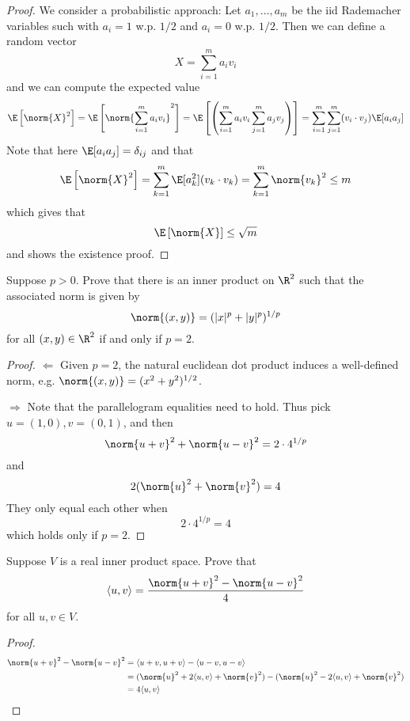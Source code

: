 \documentclass{extarticle}
\begin{document}
\begin{proof}
We consider a probabilistic approach: Let \(a_1, \ldots, a_m\) be the iid Rademacher variables
such with \(a_i = 1\) w.p. \(1/2\) and \(a_i = 0\) w.p. \(1/2\). Then we can define a random
vector
\[X = \sum_{i=1}^{m}a_i v_i\]
and we can compute the expected value
\[\E \left[\norm{X}^2 \right]
= \E \left[ \norm{\sum_{i=1}^{m} a_i v_i} ^2 \right]
= \E \left[ \left(\sum_{i=1}^{m} a_i v_i \sum_{j=1}^{m}a_j v_j \right) \right]
=  \sum_{i=1}^{m} \sum_{j=1}^{m} (v_i \cdot v_j) \E [a_i a_j]\]
Note that here \(\E[a_i a_j] = \delta_{ij}\) and that
\[\E \left[\norm{X}^2 \right]  = \sum_{k=1}^{m} \E[a_k^2](v_k \cdot v_k) = \sum_{k=1}^{m} \norm{v_k}^2 \leq m\]
which gives that
\[\E \left[\norm{X} \right]  \leq \sqrt{m}\]
and shows the existence proof.
\end{proof}

\begin{problem}{25}
    Suppose \(p > 0\). Prove that there is an inner product on \(\R^2\) such that the associated norm
    is given by
    \[\norm{(x, y)} = (|x|^p + |y|^{p})^{1/p}\]
    for all \((x,y) \in \R^2\) if and only if \(p = 2\).
\end{problem}

\begin{proof}
\(\Leftarrow\) Given \(p = 2\), the natural euclidean dot product induces a well-defined norm, e.g.
\(\norm{(x,y)} = (x^2 + y^2)^{1/2}\).

\(\Rightarrow\) Note that the parallelogram equalities need to hold. Thus pick \(u = (1,0), v = (0, 1)\),
and then
\[\norm{u + v}^2 + \norm{u - v}^2 = 2\cdot4^{1/p} \]
and
\[2(\norm{u}^2 + \norm{v}^2) = 4\]
They only equal each other when
\[2 \cdot 4^{1/p} = 4\]
which holds only if \(p = 2\).
\end{proof}

\begin{problem}{26}
    Suppose \(V\) is a real inner product space. Prove that
    \[\langle u,v \rangle = \frac{\norm{u + v}^2 - \norm{u - v}^2}{4}\]
    for all \(u, v \in V\).
\end{problem}

\begin{proof}
\begin{align*}
    \norm{u + v}^2 - \norm{u - v}^2
    &= \langle u+v,u+v \rangle - \langle u-v,u-v \rangle \\
    &= (\norm{u}^2 + 2 \langle u,v \rangle + \norm{v}^2) - (\norm{u}^2 - 2 \langle u,v \rangle + \norm{v}^2) \\
    &= 4 \langle u,v \rangle
\end{align*}
\end{proof}
\end{document}
